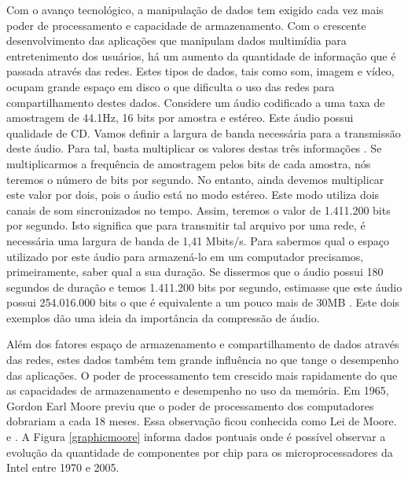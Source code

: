 Com o avanço tecnológico, a manipulação de dados tem exigido cada vez mais poder de processamento e capacidade de armazenamento. Com o crescente desenvolvimento das aplicações que manipulam dados multimídia para entretenimento dos usuários, há um aumento da quantidade de informação que é passada através das redes. Estes tipos de dados, tais como som, imagem e vídeo, ocupam grande espaço em disco o que dificulta o uso das redes para compartilhamento destes dados. Considere um áudio codificado a uma taxa de amostragem de 44.1Hz, 16 bits por amostra e estéreo. Este áudio possui qualidade de CD. Vamos definir a largura de banda necessária para a transmissão deste áudio. Para tal, basta multiplicar os valores destas três informações \cite{forouzan}. Se multiplicarmos a frequência de amostragem pelos bits de cada amostra, nós teremos o número de bits por segundo. No entanto, ainda devemos multiplicar este valor por dois, pois o áudio está no modo estéreo. Este modo utiliza dois canais de som sincronizados no tempo. Assim, teremos o valor de 1.411.200 bits por segundo. Isto significa que para transmitir tal arquivo por uma rede, é necessária uma largura de banda de 1,41 Mbits/s. Para sabermos qual o espaço utilizado por este áudio para armazená-lo em um computador precisamos, primeiramente, saber qual a sua duração. Se dissermos que o áudio possui 180 segundos de duração e temos 1.411.200 bits por segundo, estimasse que este áudio possui 254.016.000 bits o que é equivalente a um pouco mais de 30MB \cite{forouzan}. Este dois exemplos dão uma ideia da importância da compressão de áudio.


Além dos fatores espaço de armazenamento e compartilhamento de dados através das redes, estes dados também tem grande influência no que tange o desempenho das aplicações. O poder de processamento tem crescido mais rapidamente do que as capacidades de armazenamento e desempenho no uso da memória. Em 1965, Gordon Earl Moore previu que o poder de processamento dos computadores dobrariam a cada 18 meses. Essa observação ficou conhecida como Lei de Moore. \cite{moore} e \cite{tanenbaumorganizacao}. A Figura \ref{graphicmoore} informa dados pontuais onde é possível observar a evolução da quantidade de componentes por chip para os microprocessadores da Intel entre 1970 e 2005.

